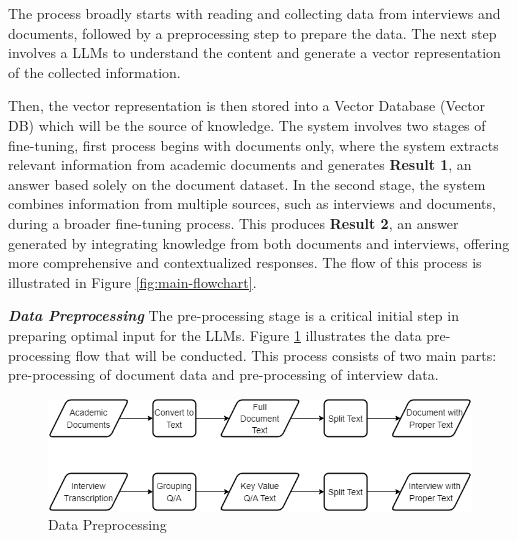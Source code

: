 \documentclass[runningheads]{llncs}
\begin{document}
The process broadly starts with reading and collecting data from interviews and documents, followed by a preprocessing step to prepare the data. The next step involves a LLMs to understand the content and generate a vector representation of the collected information. 

Then, the vector representation is then stored into a Vector Database (Vector DB) which will be the source of knowledge. The system involves two stages of fine-tuning, first process begins with documents only, where the system extracts relevant information from academic documents and generates \textbf{Result 1}, an answer based solely on the document dataset. In the second stage, the system combines information from multiple sources, such as interviews and documents, during a broader fine-tuning process. This produces \textbf{Result 2}, an answer generated by integrating knowledge from both documents and interviews, offering more comprehensive and contextualized responses. The flow of this process is illustrated in Figure \ref{fig:main-flowchart}.
\newpage

\textbf{\textit{Data Preprocessing}} The pre-processing stage is a critical initial step in preparing optimal input for the LLMs. Figure \ref{fig:preprocessing} illustrates the data pre-processing flow that will be conducted. This process consists of two main parts: pre-processing of document data and pre-processing of interview data.

\begin{figure}[htbp]
        \centerline{\includegraphics[scale=0.4]{eng-preproc.png}}
        \caption{Data Preprocessing}
        \label{fig:preprocessing}
    \end{figure}
    
\end{document}
